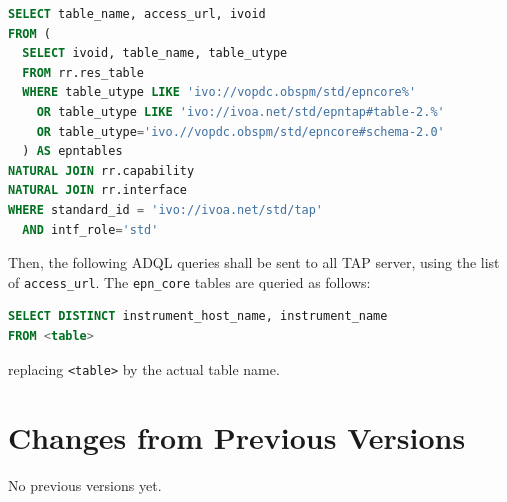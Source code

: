 \documentclass[11pt,a4paper]{ivoa}
\begin{document}
\begin{lstlisting}[language=SQL]
SELECT table_name, access_url, ivoid
FROM (
  SELECT ivoid, table_name, table_utype
  FROM rr.res_table
  WHERE table_utype LIKE 'ivo://vopdc.obspm/std/epncore%'
    OR table_utype LIKE 'ivo://ivoa.net/std/epntap#table-2.%'
    OR table_utype='ivo.//vopdc.obspm/std/epncore#schema-2.0'
  ) AS epntables
NATURAL JOIN rr.capability
NATURAL JOIN rr.interface
WHERE standard_id = 'ivo://ivoa.net/std/tap'
  AND intf_role='std'
\end{lstlisting}

Then, the following ADQL queries shall be sent to all TAP server,
using the list of \texttt{access\_url}. The \texttt{epn\_core}
tables are queried as follows:

\begin{lstlisting}[language=SQL]
SELECT DISTINCT instrument_host_name, instrument_name
FROM <table>
\end{lstlisting}
replacing \texttt{<table>} by the actual table name.


\section{Changes from Previous Versions}

No previous versions yet.



\end{document}
